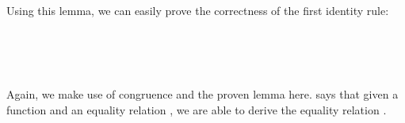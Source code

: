 \documentclass{l4proj}
\begin{document}
Using this lemma, we can easily prove the correctness of the first identity rule:
\begin{code}%
\>[0]\<%
\\
\>[0]\AgdaSpace{}%
\AgdaSymbol{:}%
\>[106I]\AgdaSymbol{\{}\AgdaSpace{}%
\AgdaSymbol{:}\AgdaSpace{}%
\AgdaSymbol{\}}\AgdaSpace{}%
\AgdaSpace{}%
\AgdaSymbol{\{}\AgdaSpace{}%
\AgdaSpace{}%
\AgdaSymbol{:}\AgdaSpace{}%
\AgdaSymbol{\}}\AgdaSpace{}%
\AgdaSpace{}%
\AgdaSymbol{(}\AgdaSpace{}%
\AgdaSymbol{:}\AgdaSpace{}%
\AgdaSpace{}%
\AgdaSpace{}%
\AgdaSpace{}%
\AgdaSpace{}%
\AgdaSpace{}%
\AgdaSpace{}%
\AgdaSymbol{)}\AgdaSpace{}%
\AgdaSpace{}%
\AgdaSymbol{(}\AgdaSpace{}%
\AgdaSymbol{:}\AgdaSpace{}%
\AgdaSpace{}%
\AgdaSpace{}%
\AgdaSymbol{)}\AgdaSpace{}%
\<%
\\
\>[.][@{}l@{}]\<[106I]%
\>[12]\AgdaSymbol{(}\AgdaSpace{}%
\AgdaSpace{}%
\AgdaSpace{}%
\AgdaSymbol{)}\AgdaSpace{}%
\AgdaSpace{}%
\AgdaSpace{}%
\AgdaSpace{}%
\<%
\\
\>[0]\AgdaSpace{}%
\AgdaSpace{}%
\AgdaSpace{}%
\AgdaSymbol{=}\AgdaSpace{}%
\AgdaSpace{}%
\AgdaSpace{}%
\AgdaSymbol{(}\AgdaSpace{}%
\AgdaSymbol{)}\<%
\end{code}
Again, we make use of congruence and the proven lemma here. \AgdaSpace{}%
\AgdaSpace{}%
\AgdaSymbol{(}\AgdaSpace{}%
\AgdaSymbol{)}\AgdaSpace{} says that given a function  and an equality relation \AgdaSpace{}%
\AgdaSpace{}%
\AgdaSpace{}%
\AgdaSpace{}%
, we are able to derive the equality relation  \AgdaSpace{}\AgdaSymbol{(}\AgdaSpace{}%
\AgdaSymbol{)}\AgdaSpace{}%
\AgdaSpace{}%
\AgdaSpace{}%
\AgdaSpace{}.
\end{document}
